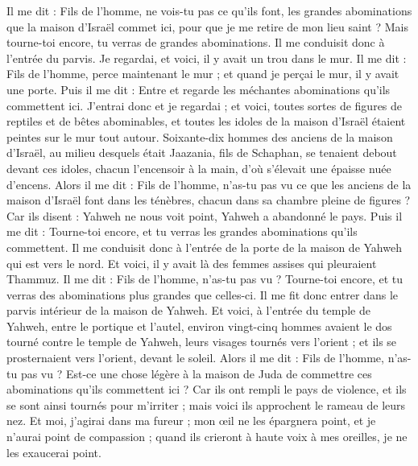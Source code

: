 \begin{multicols}{2}
Il me dit : Fils de l'homme, ne vois-tu pas ce qu'ils font, les grandes abominations que la maison d'Israël commet ici, pour que je me retire de mon lieu saint ? Mais tourne-toi encore, tu verras de grandes abominations.
Il me conduisit donc à l'entrée du parvis. Je regardai, et voici, il y avait un trou dans le mur.
Il me dit : Fils de l'homme, perce maintenant le mur ; et quand je perçai le mur, il y avait une porte.
Puis il me dit : Entre et regarde les méchantes abominations qu'ils commettent ici.
J'entrai donc et je regardai ; et voici, toutes sortes de figures de reptiles et de bêtes abominables, et toutes les idoles de la maison d'Israël étaient peintes sur le mur tout autour.
Soixante-dix hommes des anciens de la maison d'Israël, au milieu desquels était Jaazania, fils de Schaphan, se tenaient debout devant ces idoles, chacun l'encensoir à la main, d'où s'élevait une épaisse nuée d'encens.
Alors il me dit : Fils de l'homme, n'as-tu pas vu ce que les anciens de la maison d'Israël font dans les ténèbres, chacun dans sa chambre pleine de figures ? Car ils disent : Yahweh ne nous voit point, Yahweh a abandonné le pays.
Puis il me dit : Tourne-toi encore, et tu verras les grandes abominations qu'ils commettent.
Il me conduisit donc à l'entrée de la porte de la maison de Yahweh qui est vers le nord. Et voici, il y avait là des femmes assises qui pleuraient Thammuz.
Il me dit : Fils de l'homme, n'as-tu pas vu ? Tourne-toi encore, et tu verras des abominations plus grandes que celles-ci.
Il me fit donc entrer dans le parvis intérieur de la maison de Yahweh. Et voici, à l'entrée du temple de Yahweh, entre le portique et l'autel, environ vingt-cinq hommes avaient le dos tourné contre le temple de Yahweh, leurs visages tournés vers l'orient ; et ils se prosternaient vers l'orient, devant le soleil.
Alors il me dit : Fils de l'homme, n'as-tu pas vu ? Est-ce une chose légère à la maison de Juda de commettre ces abominations qu'ils commettent ici ? Car ils ont rempli le pays de violence, et ils se sont ainsi tournés pour m'irriter ; mais voici ils approchent le rameau de leurs nez.
Et moi, j'agirai dans ma fureur ; mon œil ne les épargnera point, et je n'aurai point de compassion ; quand ils crieront à haute voix à mes oreilles, je ne les exaucerai point.

\end{multicols}
